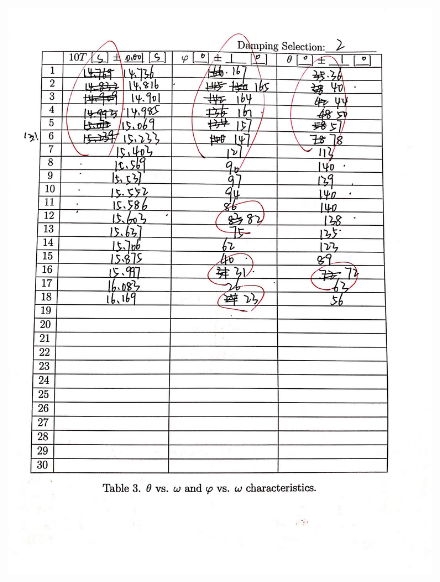 \documentclass[12pt,a4paper]{article}
\begin{document}
\begin{figure}[t]
    \centering
    \includegraphics[scale=0.25]{raw2.jpg}
\end{figure}
\end{document}
